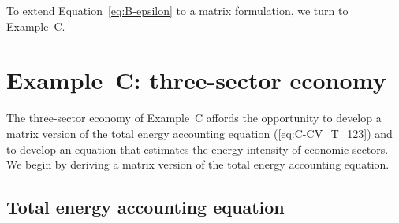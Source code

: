 To extend Equation~\ref{eq:B-epsilon}
to a matrix formulation, we turn to Example~C.


\section{Example~C: three-sector economy} %
\label{sec:C-intensity}

The three-sector economy of Example~C affords the opportunity 
to develop a matrix version 
of the total energy accounting equation (\ref{eq:C-CV_T_123})
and to develop an equation that estimates the
energy intensity of economic sectors. 
We begin by deriving a matrix version of the total energy accounting equation.


\subsection{Total energy accounting equation}


